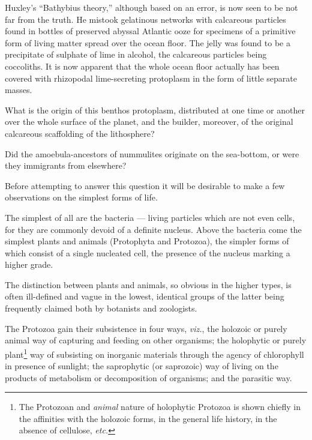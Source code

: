 \documentclass[a4paper, 12pt, oneside, landscape]{article}
\begin{document}
Huxley's ``Bathybius theory,'' although based on an error, is now seen to be not far from the truth. He mistook gelatinous networks with calcareous particles found in bottles of preserved abyssal Atlantic ooze for specimens of a primitive form of living matter spread over the ocean floor. The jelly was found to be a precipitate of sulphate of lime in alcohol, the calcareous particles being coccoliths. It is now apparent that the whole ocean floor actually has been covered with rhizopodal lime-secreting protoplasm in the form of little separate masses.

What is the origin of this benthos protoplasm, distributed at one time or another over the whole surface of the planet, and the builder, moreover, of the original calcareous scaffolding of the lithosphere?

Did the amoebula-ancestors of nummulites originate on the sea-bottom, or were they immigrants from elsewhere?

Before attempting to answer this question it will be desirable to make a few observations on the simplest forms of life.

The simplest of all are the bacteria --- living particles which are not even cells, for they are commonly devoid of a definite nucleus. Above the bacteria come the simplest plants and animals (Protophyta and Protozoa), the simpler forms of which consist of a single nucleated cell, the presence of the nucleus marking a higher grade.

The distinction between plants and animals, so obvious in the higher types, is often ill-defined and vague in the lowest, identical groups of the latter being frequently claimed both by botanists and zoologists.

The Protozoa gain their subsistence in four ways, \emph{viz.}, the holozoic or purely animal way of capturing and feeding on other organisms; the holophytic or purely plant\footnote{The Protozoan and \emph{animal} nature of holophytic Protozoa is shown chiefly in the affinities with the holozoic forms, in the general life history, in the absence of cellulose, \emph{etc.}} way of subsisting on inorganic materials through the agency of chlorophyll in presence of sunlight; the saprophytic (or saprozoic) way of living on the products of metabolism or decomposition of organisms; and the parasitic way.
\end{document}
